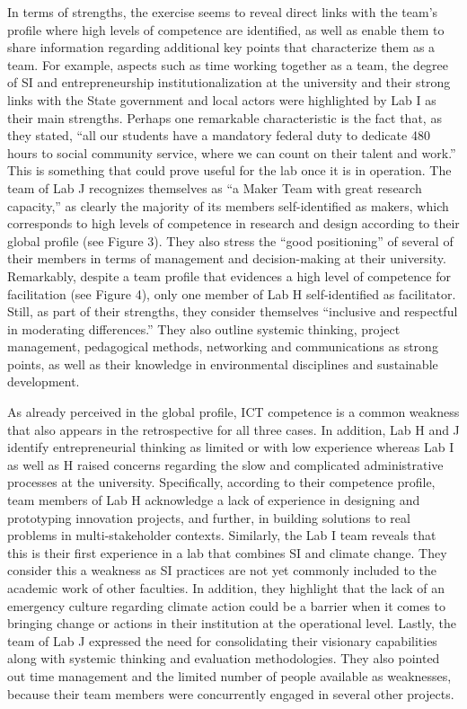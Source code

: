 \documentclass[AMA,STIX1COL,APA,STIX2COL]{WileyNJD-v2}
\begin{document}
In terms of strengths, the exercise seems to reveal direct links with
the team's profile where high levels of competence are identified, as
well as enable them to share information regarding additional key points
that characterize them as a team. For example, aspects such as time
working together as a team, the degree of SI and entrepreneurship
institutionalization at the university and their strong links with the
State government and local actors were highlighted by Lab I as their
main strengths. Perhaps one remarkable characteristic is the fact that,
as they stated, ``all our students have a mandatory federal duty to
dedicate 480 hours to social community service, where we can count on
their talent and work.'' This is something that could prove useful for
the lab once it is in operation. The team of Lab J recognizes themselves
as ``a Maker Team with great research capacity,'' as clearly the
majority of its members self-identified as makers, which corresponds to
high levels of competence in research and design according to their
global profile (see Figure 3). They also stress the ``good positioning''
of several of their members in terms of management and decision-making
at their university. Remarkably, despite a team profile that evidences a
high level of competence for facilitation (see Figure 4), only one
member of Lab H self-identified as facilitator. Still, as part of their
strengths, they consider themselves ``inclusive and respectful in
moderating differences.'' They also outline systemic thinking, project
management, pedagogical methods, networking and communications as strong
points, as well as their knowledge in environmental disciplines and
sustainable development.

As already perceived in the global profile, ICT competence is a common
weakness that also appears in the retrospective for all three cases. In
addition, Lab H and J identify entrepreneurial thinking as limited or
with low experience whereas Lab I as well as H raised concerns regarding
the slow and complicated administrative processes at the university.
Specifically, according to their competence profile, team members of Lab
H acknowledge a lack of experience in designing and prototyping
innovation projects, and further, in building solutions to real problems
in multi-stakeholder contexts. Similarly, the Lab I team reveals that
this is their first experience in a lab that combines SI and climate
change. They consider this a weakness as SI practices are not yet
commonly included to the academic work of other faculties. In addition,
they highlight that the lack of an emergency culture regarding climate
action could be a barrier when it comes to bringing change or actions in
their institution at the operational level. Lastly, the team of Lab J
expressed the need for consolidating their visionary capabilities along
with systemic thinking and evaluation methodologies. They also pointed
out time management and the limited number of people available as
weaknesses, because their team members were concurrently engaged in
several other projects.
\end{document}
